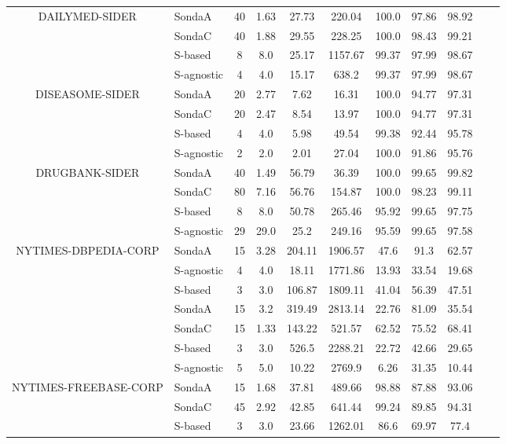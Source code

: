 \begin{center}
\begin{table*}[h]
\begin{tabular}{|c|l|c|c|c|c|c|c|c|c|c|}
 \multirow{4}{*}{DAILYMED-SIDER}  & SondaA  & 40 & 1.63   & 27.73  & 220.04 & 100.0 & 97.86 & 98.92  \\
 & SondaC  & 40 & 1.88   & 29.55  & 228.25 & 100.0 & 98.43 & 99.21  \\
 & S-based  & 8 & 8.0   & 25.17  & 1157.67 & 99.37 & 97.99 & 98.67  \\
 & S-agnostic  & 4 & 4.0   & 15.17  & 638.2 & 99.37 & 97.99 & 98.67  \\ \hline
\multirow{4}{*}{DISEASOME-SIDER}  & SondaA  & 20 & 2.77   & 7.62  & 16.31 & 100.0 & 94.77 & 97.31  \\
 & SondaC  & 20 & 2.47   & 8.54  & 13.97 & 100.0 & 94.77 & 97.31  \\
 & S-based  & 4 & 4.0   & 5.98  & 49.54 & 99.38 & 92.44 & 95.78  \\
 & S-agnostic  & 2 & 2.0   & 2.01  & 27.04 & 100.0 & 91.86 & 95.76  \\ \hline
\multirow{4}{*}{DRUGBANK-SIDER}  & SondaA  & 40 & 1.49   & 56.79  & 36.39 & 100.0 & 99.65 & 99.82  \\
 & SondaC  & 80 & 7.16   & 56.76  & 154.87 & 100.0 & 98.23 & 99.11  \\
 & S-based  & 8 & 8.0   & 50.78  & 265.46 & 95.92 & 99.65 & 97.75  \\
 & S-agnostic  & 29 & 29.0   & 25.2  & 249.16 & 95.59 & 99.65 & 97.58  \\ \hline
\multirow{4}{*}{NYTIMES-DBPEDIA-CORP}  & SondaA  & 15 & 3.28   & 204.11  & 1906.57 & 47.6 & 91.3 & 62.57  \\
 & S-agnostic  & 4 & 4.0   & 18.11  & 1771.86 & 13.93 & 33.54 & 19.68  \\ \hline
 & S-based  & 3 & 3.0   & 106.87  & 1809.11 & 41.04 & 56.39 & 47.51  \\
\multirow{4}{*}{NYTIMES-DBPEDIA-GEO}  & SondaA  & 15 & 3.2   & 319.49  & 2813.14 & 22.76 & 81.09 & 35.54  \\
 & SondaC  & 15 & 1.33   & 143.22  & 521.57 & 62.52 & 75.52 & 68.41  \\
 & S-based  & 3 & 3.0   & 526.5  & 2288.21 & 22.72 & 42.66 & 29.65  \\
 & S-agnostic  & 5 & 5.0   & 10.22  & 2769.9 & 6.26 & 31.35 & 10.44  \\ \hline
\multirow{4}{*}{NYTIMES-FREEBASE-CORP}  & SondaA  & 15 & 1.68   & 37.81  & 489.66 & 98.88 & 87.88 & 93.06  \\
 & SondaC  & 45 & 2.92   & 42.85  & 641.44 & 99.24 & 89.85 & 94.31  \\
 & S-based  & 3 & 3.0   & 23.66  & 1262.01 & 86.6 & 69.97 & 77.4  \\

\end{tabular}
\end{table*}
\end{center}
